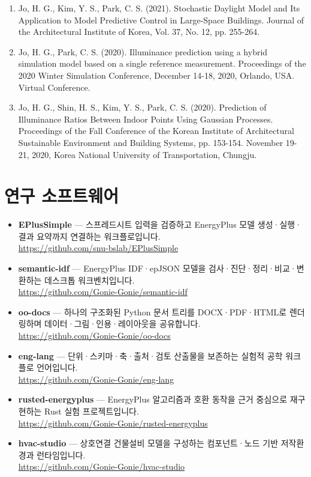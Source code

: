 \documentclass[10pt,a4paper]{article}
\begin{document}
\begin{enumerate}[leftmargin=*]
\item Jo, H. G., Kim, Y. S., Park, C. S. (2021). Stochastic Daylight Model and Its Application to Model Predictive Control in Large-Space Buildings. Journal of the Architectural Institute of Korea, Vol. 37, No. 12, pp. 255-264.
\item Jo, H. G., Park, C. S. (2020). Illuminance prediction using a hybrid simulation model based on a single reference measurement. Proceedings of the 2020 Winter Simulation Conference, December 14-18, 2020, Orlando, USA. Virtual Conference.
\item Jo, H. G., Shin, H. S., Kim, Y. S., Park, C. S. (2020). Prediction of Illuminance Ratios Between Indoor Points Using Gaussian Processes. Proceedings of the Fall Conference of the Korean Institute of Architectural Sustainable Environment and Building Systems, pp. 153-154. November 19-21, 2020, Korea National University of Transportation, Chungju.
\end{enumerate}

\section*{연구 소프트웨어}
\begin{itemize}[leftmargin=*]
\item \textbf{EPlusSimple} --- 스프레드시트 입력을 검증하고 EnergyPlus 모델 생성·실행·결과 요약까지 연결하는 워크플로입니다.\\\url{https://github.com/snu-bslab/EPlusSimple}
\item \textbf{semantic-idf} --- EnergyPlus IDF·epJSON 모델을 검사·진단·정리·비교·변환하는 데스크톱 워크벤치입니다.\\\url{https://github.com/Gonie-Gonie/semantic-idf}
\item \textbf{oo-docs} --- 하나의 구조화된 Python 문서 트리를 DOCX·PDF·HTML로 렌더링하며 데이터·그림·인용·레이아웃을 공유합니다.\\\url{https://github.com/Gonie-Gonie/oo-docs}
\item \textbf{eng-lang} --- 단위·스키마·축·출처·검토 산출물을 보존하는 실험적 공학 워크플로 언어입니다.\\\url{https://github.com/Gonie-Gonie/eng-lang}
\item \textbf{rusted-energyplus} --- EnergyPlus 알고리즘과 호환 동작을 근거 중심으로 재구현하는 Rust 실험 프로젝트입니다.\\\url{https://github.com/Gonie-Gonie/rusted-energyplus}
\item \textbf{hvac-studio} --- 상호연결 건물설비 모델을 구성하는 컴포넌트·노드 기반 저작환경과 런타임입니다.\\\url{https://github.com/Gonie-Gonie/hvac-studio}
\end{itemize}
\end{document}
